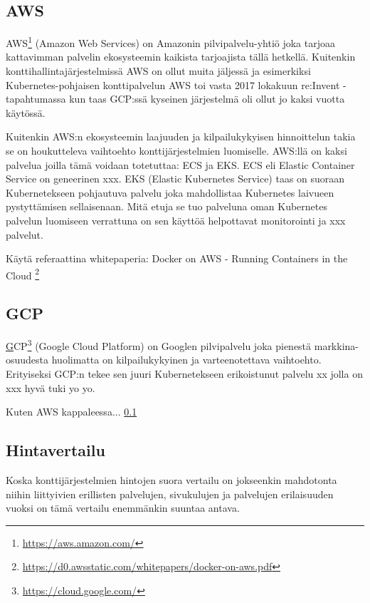 \documentclass[finnish]{tktltiki2}
\theoremstyle{definition}
\theoremstyle{remark}
\begin{document}
\subsection{AWS}
\label{ch:aws}

AWS\footnote{\url{https://aws.amazon.com/}} (Amazon Web Services) on Amazonin pilvipalvelu-yhtiö joka tarjoaa kattavimman palvelin ekosysteemin kaikista tarjoajista tällä hetkellä. Kuitenkin konttihallintajärjestelmissä AWS on ollut muita jäljessä ja esimerkiksi Kubernetes-pohjaisen konttipalvelun AWS toi vasta 2017 lokakuun re:Invent -tapahtumassa kun taas GCP:ssä kyseinen järjestelmä oli ollut jo kaksi vuotta käytössä.

Kuitenkin AWS:n ekosysteemin laajuuden ja kilpailukykyisen hinnoittelun takia se on houkutteleva vaihtoehto konttijärjestelmien luomiselle. AWS:llä on kaksi palvelua joilla tämä voidaan totetuttaa: ECS ja EKS. ECS eli Elastic Container Service on geneerinen xxx. EKS (Elastic Kubernetes Service) taas on suoraan Kubernetekseen pohjautuva palvelu joka mahdollistaa Kubernetes laivueen pystyttämisen sellaisenaan. Mitä etuja se tuo palveluna oman Kubernetes palvelun luomiseen verrattuna on sen käyttöä helpottavat monitorointi ja xxx palvelut.

Käytä referaattina whitepaperia: Docker on AWS - Running Containers in the Cloud \footnote{\url{https://d0.awsstatic.com/whitepapers/docker-on-aws.pdf}}

\subsection{GCP}
\label{sb:gcp}

\href{https://cloud.google.com/}GCP\footnote{\url{https://cloud.google.com/}} (Google Cloud Platform) on Googlen pilvipalvelu joka pienestä markkina-osuudesta huolimatta on kilpailukykyinen ja varteenotettava vaihtoehto. Erityiseksi GCP:n tekee sen juuri Kubernetekseen erikoistunut palvelu xx jolla on xxx hyvä tuki yo yo.

Kuten AWS kappaleessa... \ref{ch:aws}


\subsection{Hintavertailu}

Koska konttijärjestelmien hintojen suora vertailu on jokseenkin mahdotonta niihin liittyivien erillisten palvelujen, sivukulujen ja palvelujen erilaisuuden vuoksi on tämä vertailu enemmänkin suuntaa antava.
\end{document}
